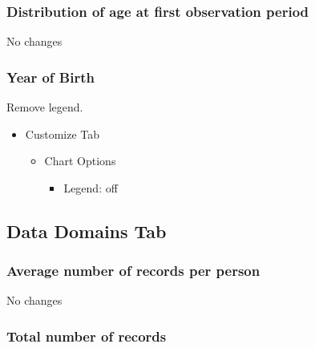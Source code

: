 \documentclass[
]{book}
\providecommand{\tightlist}{%
  \setlength{\itemsep}{0pt}\setlength{\parskip}{0pt}}
\begin{document}
\hypertarget{distribution-of-age-at-first-observation-period-1}{%
\subsubsection*{Distribution of age at first observation period}\label{distribution-of-age-at-first-observation-period-1}}

No changes

\hypertarget{year-of-birth-1}{%
\subsubsection*{Year of Birth}\label{year-of-birth-1}}

Remove legend.

\begin{itemize}
\tightlist
\item
  Customize Tab

  \begin{itemize}
  \tightlist
  \item
    Chart Options

    \begin{itemize}
    \tightlist
    \item
      Legend: off
    \end{itemize}
  \end{itemize}
\end{itemize}

\hypertarget{data-domains-tab-1}{%
\subsection*{Data Domains Tab}\label{data-domains-tab-1}}

\hypertarget{average-number-of-records-per-person-1}{%
\subsubsection*{Average number of records per person}\label{average-number-of-records-per-person-1}}

No changes

\hypertarget{total-number-of-records-1}{%
\subsubsection*{Total number of records}\label{total-number-of-records-1}}
\end{document}
